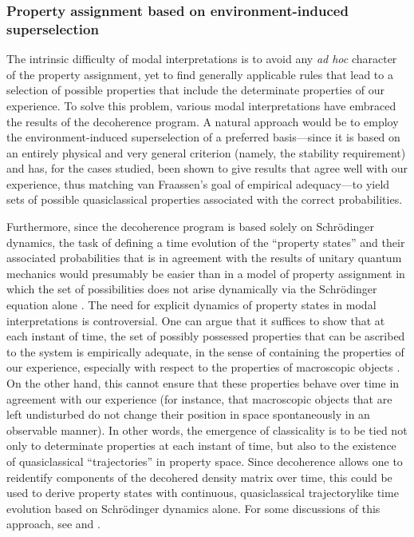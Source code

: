 \documentclass[twocolumn,rmp,aps,amsmath,amsfonts,noshowkeys,noshowpacs]{revtex4}
\begin{document}
\subsubsection{Property assignment based on environment-induced superselection}

The intrinsic difficulty of modal interpretations is to avoid any
\emph{ad hoc} character of the property assignment, yet to find
generally applicable rules that lead to a selection of possible
properties that include the determinate properties of our experience.
To solve this problem, various modal interpretations have embraced the
results of the decoherence program. A natural approach would be to
employ the environment-induced superselection of a preferred
basis---since it is based on an entirely physical and very general
criterion (namely, the stability requirement) and has, for the cases
studied, been shown to give results that agree well with our
experience, thus matching van Fraassen's goal of empirical
adequacy---to yield sets of possible quasiclassical properties
associated with the correct probabilities.

Furthermore, since the decoherence program is based solely on
Schr\"odinger dynamics, the task of defining a time evolution of the
``property states'' and their associated probabilities that is in
agreement with the results of unitary quantum mechanics would
presumably be easier than in a model of property assignment in which
the set of possibilities does not arise dynamically via the
Schr\"odinger equation alone \citep[for a detailed proposal for modal
dynamics of the latter type, see][]{Bacciagaluppi:1999:iz}. The need
for explicit dynamics of property states in modal interpretations is
controversial.  One can argue that it suffices to show that at each
instant of time, the set of possibly possessed properties that can be
ascribed to the system is empirically adequate, in the sense of
containing the properties of our experience, especially with respect
to the properties of macroscopic objects \citep[this is essentially
the view of, for example,][]{Fraassen:1973:yb,Fraassen:1991:ys}.  On
the other hand, this cannot ensure that these properties behave over
time in agreement with our experience (for instance, that macroscopic
objects that are left undisturbed do not change their position in
space spontaneously in an observable manner). In other words, the
emergence of classicality is to be tied not only to determinate
properties at each instant of time, but also to the existence of
quasiclassical ``trajectories'' in property space.  Since decoherence
allows one to reidentify components of the decohered density matrix
over time, this could be used to derive property states with
continuous, quasiclassical trajectorylike time evolution based on
Schr\"odinger dynamics alone. For some discussions of this approach,
see \citet{Hemmo:1996:fz} and \citet{Bacciagaluppi:1999:iz}.
\end{document}
